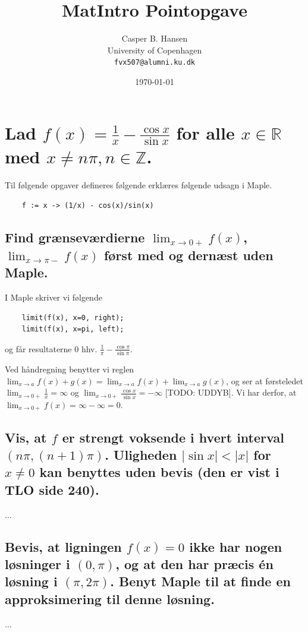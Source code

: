 \documentclass[11pt,a4paper]{article}
\title{MatIntro Pointopgave \assignmentnumber}
\author
{
    Casper B. Hansen\\
    University of Copenhagen\\
    {\tt fvx507@alumni.ku.dk}
}
\date{\today}
\newcommand{\modulus}[1]{\lvert#1\rvert}
\newcommand{\limit}[2]{\lim_{#1 \rightarrow #2}}
\begin{document}


\section
{
    \mdseries
    Lad $f(x) = \frac{1}{x} - \frac{\cos x}{\sin x}$ for alle $x \in
    \mathbb{R}$ med $x \neq n\pi, n \in \mathbb{Z}$.
}
Til følgende opgaver defineres følgende erklæres følgende udsagn i Maple.
\begin{lstlisting}
    f := x -> (1/x) - cos(x)/sin(x)
\end{lstlisting}

\subsection
{
    \mdseries
    Find grænseværdierne $\limit{x}{0+} f(x)$, $\limit{x}{\pi-} f(x)$ først
    med og dernæst uden Maple.
}
I Maple skriver vi følgende
\begin{lstlisting}
    limit(f(x), x=0, right);
    limit(f(x), x=pi, left);
\end{lstlisting}
og får resultaterne $0$ hhv. $\frac{1}{\pi} - \frac{\cos \pi}{\sin \pi}$.

Ved håndregning benytter vi reglen $\limit{x}{a} f(x) + g(x) = \limit{x}{a}
f(x) + \limit{x}{a} g(x)$, og ser at førsteledet $\limit{x}{0+} \frac{1}{x} =
\infty$ og $\limit{x}{0+} \frac{\cos x}{\sin x} = -\infty$ [TODO: UDDYB]. Vi
har derfor, at $\limit{x}{0+} f(x) = \infty - \infty = 0$.

\subsection
{
    \mdseries
    Vis, at $f$ er strengt voksende i hvert interval $(n\pi,(n+1)\pi)$.
    Uligheden $\modulus{\sin x} < \modulus{x}$ for $x \neq 0$ kan benyttes
    uden bevis (den er vist i TLO side 240).
}
...

\subsection
{
    \mdseries
    Bevis, at ligningen $f(x) = 0$ ikke har nogen løsninger i $(0, \pi)$, og
    at den har præcis én løsning i $(\pi,2\pi)$. Benyt Maple til at finde en
    approksimering til denne løsning.
}
...
\end{document}

